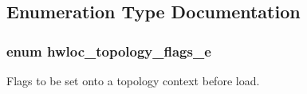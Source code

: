 \subsection{Enumeration Type Documentation}
\hypertarget{a00044_gada025d3ec20b4b420f8038d23d6e7bde}{
\subsubsection[{hwloc\_\-topology\_\-flags\_\-e}]{\setlength{\rightskip}{0pt plus 5cm}enum {\bf hwloc\_\-topology\_\-flags\_\-e}}}
\label{a00044_gada025d3ec20b4b420f8038d23d6e7bde}


Flags to be set onto a topology context before load. 

